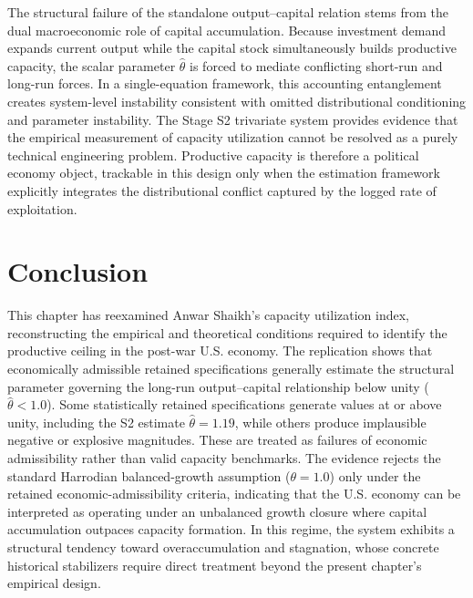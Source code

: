 \documentclass[11pt]{article}
\begin{document}
The structural failure of the standalone output--capital relation stems from the dual macroeconomic role of capital accumulation. Because investment demand expands current output while the capital stock simultaneously builds productive capacity, the scalar parameter $\hat{\theta}$ is forced to mediate conflicting short-run and long-run forces. In a single-equation framework, this accounting entanglement creates system-level instability consistent with omitted distributional conditioning and parameter instability. The Stage S2 trivariate system provides evidence that the empirical measurement of capacity utilization cannot be resolved as a purely technical engineering problem. Productive capacity is therefore a political economy object, trackable in this design only when the estimation framework explicitly integrates the distributional conflict captured by the logged rate of exploitation.

\section{Conclusion}
\label{sec:conclusion}

This chapter has reexamined Anwar Shaikh's capacity utilization index, reconstructing the empirical and theoretical conditions required to identify the productive ceiling in the post-war U.S. economy. The replication shows that economically admissible retained specifications generally estimate the structural parameter governing the long-run output--capital relationship below unity ($\hat{\theta} < 1.0$). Some statistically retained specifications generate values at or above unity, including the S2 estimate $\hat{\theta}=1.19$, while others produce implausible negative or explosive magnitudes. These are treated as failures of economic admissibility rather than valid capacity benchmarks. The evidence rejects the standard Harrodian balanced-growth assumption ($\theta = 1.0$) only under the retained economic-admissibility criteria, indicating that the U.S. economy can be interpreted as operating under an unbalanced growth closure where capital accumulation outpaces capacity formation. In this regime, the system exhibits a structural tendency toward overaccumulation and stagnation, whose concrete historical stabilizers require direct treatment beyond the present chapter's empirical design.
\end{document}
